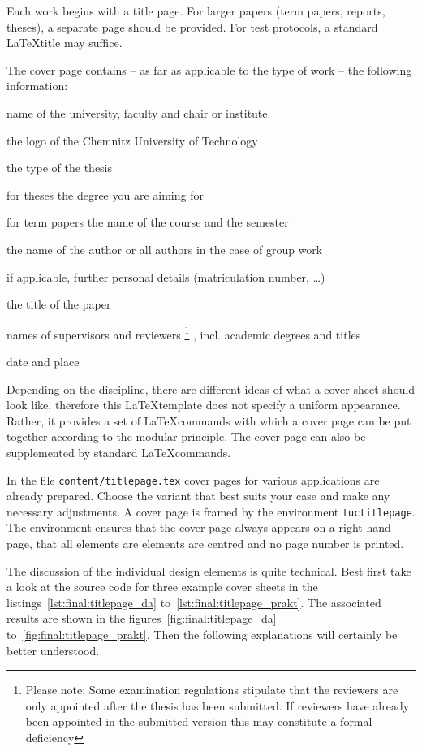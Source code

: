 Each work begins with a title page. For larger papers (term papers, reports,
theses), a separate page should be provided. For test protocols, a standard 
\LaTeX title may suffice.

The cover page contains -- as far as applicable to the type of work -- the following information:

\begin{compactitem}
\item name of the university, faculty and chair or institute.
\item the logo of the Chemnitz University of Technology
\item the type of the thesis
\item for theses the degree you are aiming for
\item for term papers the name of the course and the semester
\item the name of the author or all authors in the case of group work
\item if applicable, further personal details (matriculation number, \dots)
\item the title of the paper
\item names of supervisors and reviewers%
      \footnote{Please note: Some examination regulations stipulate that the
                reviewers are only appointed after the thesis has been submitted.
		If reviewers have already been appointed in the submitted version
		this may constitute a formal deficiency}%
      , incl. academic degrees and titles
\item date and place
\end{compactitem}

Depending on the discipline, there are different ideas of what a cover sheet
should look like, therefore this \LaTeX template does not specify a uniform
appearance. Rather, it provides a set of \LaTeX commands with which a cover
page can be put together according to the modular principle. The cover page can
also be supplemented by standard \LaTeX commands.

In the file \texttt{content/titlepage.tex} cover pages for various applications
are already prepared. Choose the variant that best suits your case and make any
necessary adjustments. A cover page is framed by the environment \texttt{tuctitlepage}.
The environment ensures that the cover page always appears on a right-hand
page, that all elements are elements are centred and no page number is printed.

The discussion of the individual design elements is quite technical. Best first
take a look at the source code for three example cover sheets in the
listings~\ref{lst:final:titlepage_da} to~\ref{lst:final:titlepage_prakt}. 
The associated results are shown in the figures~\ref{fig:final:titlepage_da}
to~\ref{fig:final:titlepage_prakt}. Then the following explanations will
certainly be better understood.


